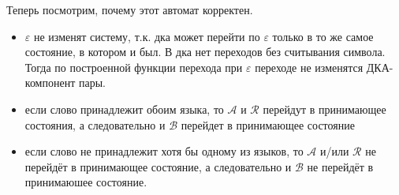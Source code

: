 \documentclass[a4paper,14pt]{article} %
\begin{document}
Теперь посмотрим, почему этот автомат корректен.
\begin{itemize}
    \item $\varepsilon$ не изменят систему, т.к. дка может перейти по $\varepsilon$ только в то же самое состояние, в котором и был. В дка нет переходов без считывания символа. Тогда по построенной функции перехода при $\varepsilon$ переходе не изменятся ДКА-компонент пары. 
    \item если слово принадлежит обоим языка, то $\mathcal{A}$ и $\mathcal{R}$ перейдут в принимающее состояния, а следовательно и $\mathcal{B}$ перейдет в принимающее состояние
    \item если слово не принадлежит хотя бы одному из языков, то $\mathcal{A}$ и/или $\mathcal{R}$ не перейдёт в принимающее состояние, а следовательно и $\mathcal{B}$ не перейдёт в принимаюшее состояние.
\end{itemize}
\end{document}
